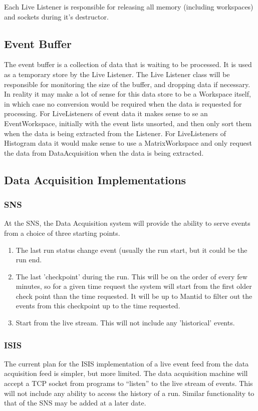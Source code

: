 Each Live Listener is responsible for releasing all memory (including workspaces) and sockets during it's destructor.



\subsection{Event Buffer}
The event buffer is a collection of data that is waiting to be processed. It is used as a temporary store by the Live Listener.  The Live Listener class will be responsible for monitoring the size of the buffer, and dropping data if necessary.  In reality it may make a lot of sense for this data store to be a Workspace itself, in which case no conversion would be required when the data is requested for processing.  For LiveListeners of event data it makes sense to se an EventWorkspace, initially with the event lists unsorted, and then only sort them when the data is being extracted from the Listener.  For LiveListeners of Histogram data it would make sense to use a MatrixWorkspace and only request the data from DataAcquisition when the data is being extracted.

\subsection{Data Acquisition Implementations}

\subsubsection{SNS}
At the SNS, the Data Acquisition system will provide the ability to serve events from a choice of three starting points.
\begin{enumerate}
\item The last run status change event (usually the run start, but it could be the run end.
\item The last 'checkpoint' during the run.  This will be on the order of every few minutes, so for a given time request the system will start from the first older check point than the time requested.  It will be up to Mantid to filter out the events from this checkpoint up to the time requested.
\item Start from the live stream.  This will not include any 'historical' events. 
\end{enumerate}

\subsubsection{ISIS}
The current plan for the ISIS implementation of a live event feed from the data acquisition feed is simpler, but more limited.  The data acquisition machine will accept a TCP socket from programs to “listen” to the live stream of events.  This will not include any ability to access the history of a run.  Similar functionality to that of the SNS may be added at a later date.